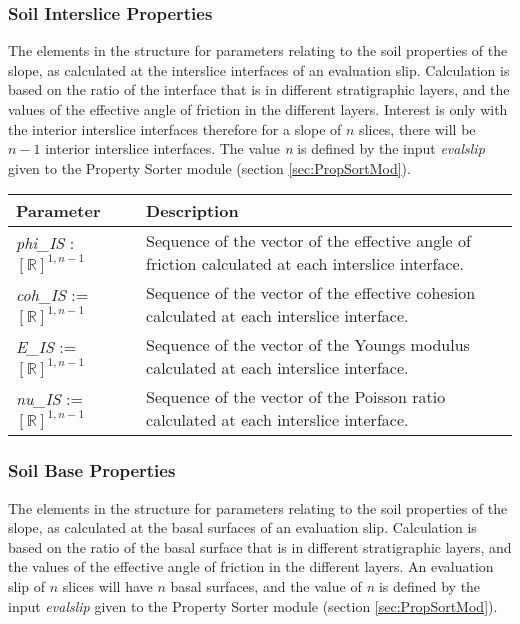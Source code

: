 \documentclass[12pt, titlepage]{article}
\begin{document}
\subsubsection{Soil Interslice Properties} \label{Tbl:SoilIntParam}
The elements in the structure for parameters relating to the soil
properties of the slope, as calculated at the interslice interfaces of
an evaluation slip. Calculation is based on the ratio of the interface
that is in different stratigraphic layers, and the values of the
effective angle of friction in the different layers. Interest is only
with the interior interslice interfaces therefore for a slope of $n$
slices, there will be $n-1$ interior interslice interfaces. The value
\textit{n} is defined by the input \textit{evalslip} given to the
Property Sorter module (section \ref{sec:PropSortMod}).


\begin{center}
\begin{longtable}{p{} p{}}
  \hline \textbf{Parameter} & \textbf{Description} \\ \hline
    
  \textit{phi\_IS} : $[\mathbb{R}]^{1,n-1}$ & Sequence of the vector
  of the effective angle of friction calculated at each interslice
  interface. \\

  \textit{coh\_IS} := $[\mathbb{R}]^{1,n-1}$ & Sequence of the vector
  of the effective cohesion calculated at each interslice interface.\\

  \textit{E\_IS} := $[\mathbb{R}]^{1,n-1}$ & Sequence of the vector of
  the Youngs modulus calculated at each interslice interface.\\

  \textit{nu\_IS} := $[\mathbb{R}]^{1,n-1}$ & Sequence of the vector
  of the Poisson ratio calculated at each interslice
  interface. \\ \hline
\end{longtable}
\end{center}

\subsubsection{Soil Base Properties} \label{Tbl:SoilBaseParam}
The elements in the structure for parameters relating to the soil
properties of the slope, as calculated at the basal surfaces of an
evaluation slip. Calculation is based on the ratio of the basal
surface that is in different stratigraphic layers, and the values of
the effective angle of friction in the different layers. An evaluation
slip of $n$ slices will have $n$ basal surfaces, and the value of
\textit{n} is defined by the input \textit{evalslip} given to
the Property Sorter module (section \ref{sec:PropSortMod}).
\end{document}
